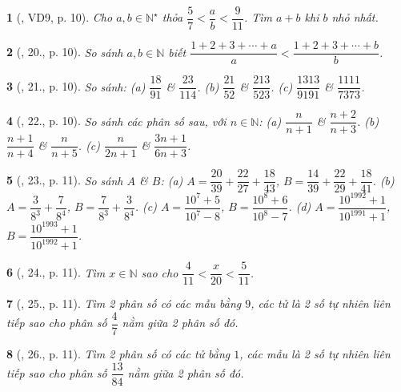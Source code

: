 \documentclass{article}
\newtheorem{baitoan}{}
\begin{document}
\begin{baitoan}[\cite{Binh_Toan_6_tap_2}, VD9, p. 10]
	Cho $a,b\in\mathbb{N}^\star$ thỏa $\dfrac{5}{7} < \dfrac{a}{b} < \dfrac{9}{11}$. Tìm $a + b$ khi $b$ nhỏ nhất.
\end{baitoan}

\begin{baitoan}[\cite{Binh_Toan_6_tap_2}, 20., p. 10]
	So sánh $a,b\in\mathbb{N}$ biết $\dfrac{1 + 2 + 3 + \cdots + a}{a} < \dfrac{1 + 2 + 3 + \cdots + b}{b}$.
\end{baitoan}

\begin{baitoan}[\cite{Binh_Toan_6_tap_2}, 21., p. 10]
	So sánh: (a) $\dfrac{18}{91}$ \& $\dfrac{23}{114}$. (b) $\dfrac{21}{52}$ \& $\dfrac{213}{523}$. (c) $\dfrac{1313}{9191}$ \& $\dfrac{1111}{7373}$.
\end{baitoan}

\begin{baitoan}[\cite{Binh_Toan_6_tap_2}, 22., p. 10]
	So sánh các phân số sau, với $n\in\mathbb{N}$: (a) $\dfrac{n}{n + 1}$ \& $\dfrac{n + 2}{n + 3}$. (b) $\dfrac{n + 1}{n + 4}$ \& $\dfrac{n}{n + 5}$. (c) $\dfrac{n}{2n + 1}$ \& $\dfrac{3n + 1}{6n + 3}$.
\end{baitoan}

\begin{baitoan}[\cite{Binh_Toan_6_tap_2}, 23., p. 11]
	So sánh $A$ \& $B$: (a) $A = \dfrac{20}{39} + \dfrac{22}{27} + \dfrac{18}{43}$, $B = \dfrac{14}{39} + \dfrac{22}{29} + \dfrac{18}{41}$. (b) $A = \dfrac{3}{8^3} + \dfrac{7}{8^4}$, $B = \dfrac{7}{8^3} + \dfrac{3}{8^4}$. (c) $A = \dfrac{10^7 + 5}{10^7 - 8}$, $B = \dfrac{10^8 + 6}{10^8 - 7}$. (d) $A = \dfrac{10^{1992} + 1}{10^{1991} + 1}$, $B = \dfrac{10^{1993} + 1}{10^{1992} + 1}$.
\end{baitoan}

\begin{baitoan}[\cite{Binh_Toan_6_tap_2}, 24., p. 11]
	Tìm $x\in\mathbb{N}$ sao cho $\dfrac{4}{11} < \dfrac{x}{20} < \dfrac{5}{11}$.
\end{baitoan}

\begin{baitoan}[\cite{Binh_Toan_6_tap_2}, 25., p. 11]
	Tìm 2 phân số có các mẫu bằng $9$, các tử là 2 số tự nhiên liên tiếp sao cho phân số $\dfrac{4}{7}$ nằm giữa 2 phân số đó.
\end{baitoan}

\begin{baitoan}[\cite{Binh_Toan_6_tap_2}, 26., p. 11]
	Tìm 2 phân số có các tử bằng $1$, các mẫu là 2 số tự nhiên liên tiếp sao cho phân số $\dfrac{13}{84}$ nằm giữa 2 phân số đó.
\end{baitoan}
\end{document}
